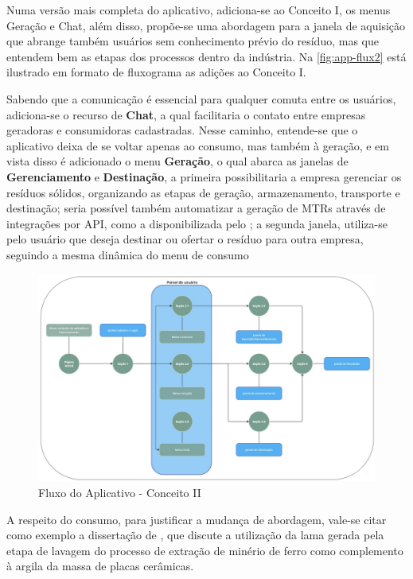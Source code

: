 Numa versão mais completa do aplicativo, adiciona-se ao Conceito I, os menus Geração e Chat, além disso, propõe-se uma abordagem para a janela de aquisição que abrange também usuários sem conhecimento prévio do resíduo, mas que entendem bem as etapas dos processos dentro da indústria. Na \autoref{fig:app-flux2} está ilustrado em formato de fluxograma as adições ao Conceito I.

Sabendo que a comunicação é essencial para qualquer comuta entre os usuários, adiciona-se o recurso de \textbf{Chat}, a qual facilitaria o contato entre empresas geradoras e consumidoras cadastradas. Nesse caminho, entende-se que o aplicativo deixa de se voltar apenas ao consumo, mas também à geração, e em vista disso é adicionado o menu \textbf{Geração}, o qual abarca as janelas de \textbf{Gerenciamento} e \textbf{Destinação}, a primeira possibilitaria a empresa gerenciar os resíduos sólidos, organizando as etapas de geração, armazenamento, transporte e destinação; seria possível também automatizar a geração de \gls{MTR}s através de integrações por \gls{API}, como a disponibilizada pelo \textcite{cetesb_web_2021}; a segunda janela, utiliza-se pelo usuário que deseja destinar ou ofertar o resíduo para outra empresa, seguindo a mesma dinâmica do menu de consumo

\begin{figure}[htb]
	\caption{\label{fig:app-flux2} Fluxo do Aplicativo - Conceito II}
	\begin{center}
		\includegraphics[scale=0.46]{images/app-flux2.jpg}
	\end{center}
\end{figure}

A respeito do consumo, para justificar a mudança de abordagem, vale-se citar como exemplo a dissertação de \textcite{lima_jose_2002}, que discute a utilização da lama gerada pela etapa de lavagem do processo de extração de minério de ferro como complemento à argila da massa de placas cerâmicas. 

